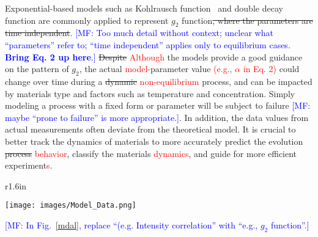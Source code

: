  Exponential-based models such as Kohlrausch function~\cite{Kohlrausch} and double decay function are commonly applied to represent $g_2$ function\sout{, where the parameters are time independent}. \textcolor{blue}{[MF: Too much detail without context; unclear what ``parameters'' refer to; ``time independent'' applies only to equilibrium cases. \textbf{Bring Eq. 2 up here}.]} \sout{Despite} 
 \textcolor{red}{Although} the models provide a good guidance on the pattern of $g_2$, the actual \textcolor{red}{model-}parameter value \textcolor{red}{(e.g., $\alpha$ in Eq. 2)} could change over time during a \sout{dynamic} 
 \textcolor{red}{non-equilibrium}
 process, and can be impacted by materials type and factors such as temperature and concentration. Simply modeling a process with a fixed form or parameter will be subject to failure \textcolor{blue}{[MF: maybe ``prone to failure'' is more appropriate.]}. In addition, the data values from actual measurements often deviate from the theoretical model. It is crucial to better track the dynamics of materials to more accurately predict the evolution \sout{process}
 \textcolor{red}{behavior}, classify the materials
 \textcolor{red}{dynamics}, and guide for more efficient experiment\textcolor{red}{s}.





\begin{wrapfigure}[9]{r}{1.6in}
  \vspace{-25pt}
  \begin{center}
\texttt{[image: images/Model\_Data.png]}
  \end{center}
  \vspace{-20pt}
  \caption{\footnotesize Model-driven data-aware learning of dynamics.}
\label{mdal}
  \vspace{-20pt}
\end{wrapfigure}

\textcolor{blue}{[MF: In Fig.~\ref{mdal}, replace ``(e.g. Intensity correlation'' with ``e.g., $g_{2}$ function''.]}


